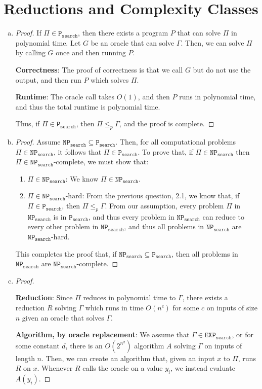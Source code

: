 \documentclass[11pt]{scrartcl}
\theoremstyle{dotlessP}
\theoremstyle{dotlessN}
\newcommand{\np}{\texttt{NP}_\texttt{search}}
\newcommand{\p}{\texttt{P}_\texttt{search}}
\newcommand{\nph}{\texttt{NP}_\texttt{search}\text{-hard}}
\newcommand{\npc}{\texttt{NP}_\texttt{search}\text{-complete}}
\newcommand{\EXP}{\texttt{EXP}_\texttt{search}}
\begin{document}
\section{Reductions and Complexity Classes}
\begin{enumerate}[(a)]
	\item 
		\begin{proof}
			If $\Pi \in \p$, then there exists a program $P$ that can solve $\Pi$ in polynomial time. Let $G$ be an oracle that can solve $\Gamma$. Then, we can solve $\Pi$ by calling $G$ once and then running $P$. 
			
			\textbf{Correctness}: The proof of correctness is that we call $G$ but do not use the output, and then run $P$ which solves $\Pi$.

			\textbf{Runtime}: The oracle call takes $O(1)$, and then $P$ runs in polynomial time, and thus the total runtime is polynomial time.

			Thus, if $\Pi \in \p$, then $\Pi \leq_p \Gamma$, and the proof is complete.
		\end{proof}
	\item 
		\begin{proof}
			Assume $\np \subseteq \p$. Then, for all computational problems $\Pi \in \np$, it follows that $\Pi \in \p$. To prove that, if $\Pi \in \np$ then  $\Pi \in \npc$, we must show that:
			\begin{enumerate}[1.]
				 \item $\Pi \in \np$: We know $\Pi \in \np$.
				 \item  $\Pi \in \nph$: From the previous question, 2.1, we know that, if $\Pi \in \p$, then $\Pi \leq_p \Gamma$. From our assumption, every problem $\Pi$ in $\np$ is in $\p$, and thus every problem in $\np$ can reduce to every other problem in $\np$, and thus all problems in $\np$ are $\nph$.
			\end{enumerate}
			This completes the proof that, if $\np \subseteq \p$, then all problems in $\np$ are $\npc$.
		\end{proof}
	\item 
		\begin{proof} \

			\textbf{Reduction}: Since $\Pi$ reduces in polynomial time to $\Gamma$, there exists a reduction $R$ solving $\Gamma$ which runs in time $O(n^c)$ for some $c$ on inputs of size $n$ given an oracle that solves $\Gamma$.
				
			\textbf{Algorithm, by oracle replacement}: We assume that $\Gamma \in \EXP$, or for some constant $d$, there is an $O(2^{n^d})$ algorithm $A$ solving $\Gamma$ on inputs of length $n$. Then, we can create an algorithm that, given an input $x$ to $\Pi$, runs $R$ on $x$. Whenever $R$ calls the oracle on a value $y_i$, we instead evaluate $A(y_i)$.


\end{proof}
\end{enumerate}
\end{document}
